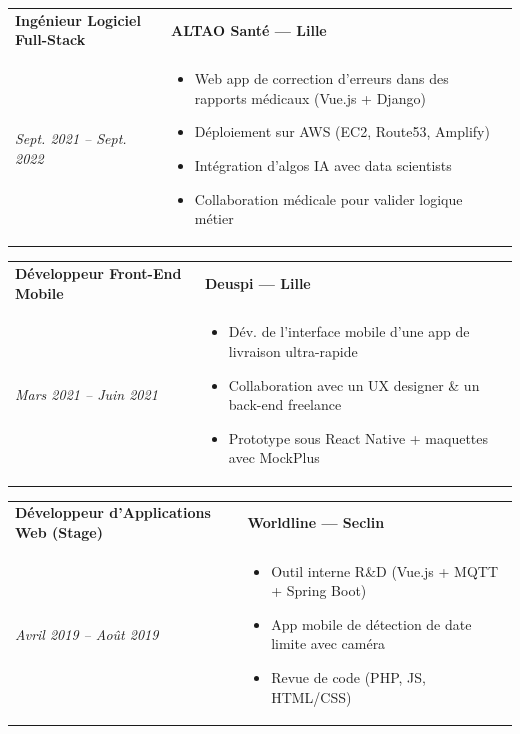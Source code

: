 \documentclass[a4paper,11pt]{article}
\begin{document}
\vspace{0.2cm}

\begin{tabularx}{\textwidth}{@{}l X@{}}
\textbf{Ingénieur Logiciel Full-Stack} & \textbf{ALTAO Santé — Lille} \\
\textit{Sept. 2021 – Sept. 2022} & \begin{itemize}[nosep]
    \item Web app de correction d'erreurs dans des rapports médicaux (Vue.js + Django)
    \item Déploiement sur AWS (EC2, Route53, Amplify)
    \item Intégration d'algos IA avec data scientists
    \item Collaboration médicale pour valider logique métier
\end{itemize} \\
\end{tabularx}

\vspace{0.2cm}

\begin{tabularx}{\textwidth}{@{}l X@{}}
\textbf{Développeur Front-End Mobile} & \textbf{Deuspi — Lille} \\
\textit{Mars 2021 – Juin 2021} & \begin{itemize}[nosep]
    \item Dév. de l'interface mobile d'une app de livraison ultra-rapide
    \item Collaboration avec un UX designer \& un back-end freelance
    \item Prototype sous React Native + maquettes avec MockPlus
\end{itemize} \\
\end{tabularx}

\vspace{0.2cm}

\begin{tabularx}{\textwidth}{@{}l X@{}}
\textbf{Développeur d'Applications Web (Stage)} & \textbf{Worldline — Seclin} \\
\textit{Avril 2019 – Août 2019} & \begin{itemize}[nosep]
    \item Outil interne R\&D (Vue.js + MQTT + Spring Boot)
    \item App mobile de détection de date limite avec caméra
    \item Revue de code (PHP, JS, HTML/CSS)
\end{itemize} \\
\end{tabularx}
\end{document}
